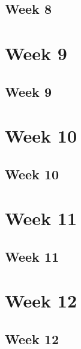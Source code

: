 \section{Week 8}
\chapter{Week 9}
\section{Week 9}
\chapter{Week 10}
\section{Week 10}
\chapter{Week 11}
\section{Week 11}
\chapter{Week 12}
\section{Week 12}


